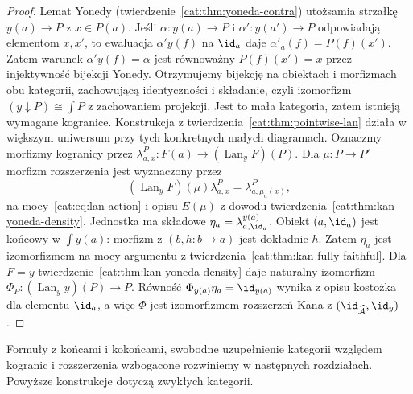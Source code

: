 \begin{proof}
Lemat Yonedy (twierdzenie~\ref{cat:thm:yoneda-contra}) utożsamia strzałkę $y(a)\to P$ z $x\in P(a)$. Jeśli $\alpha:y(a)\to P$ i $\alpha':y(a')\to P$ odpowiadają elementom $x,x'$, to ewaluacja $\alpha' y(f)$ na $\id_a$ daje $\alpha'_a(f)=P(f)(x')$. Zatem warunek $\alpha' y(f)=\alpha$ jest równoważny $P(f)(x')=x$ przez injektywność bijekcji Yonedy. Otrzymujemy bijekcję na obiektach i morfizmach obu kategorii, zachowującą identyczności i składanie, czyli izomorfizm $(y\downarrow P)\cong\int P$ z zachowaniem projekcji. Jest to mała kategoria, zatem istnieją wymagane kogranice. Konstrukcja z twierdzenia~\ref{cat:thm:pointwise-lan} działa w większym uniwersum przy tych konkretnych małych diagramach. Oznaczmy morfizmy kogranicy przez $\lambda^P_{a,x}:F(a)\to(\operatorname{Lan}_y F)(P)$. Dla $\mu:P\to P'$ morfizm rozszerzenia jest wyznaczony przez
\[
 (\operatorname{Lan}_y F)(\mu)\lambda^P_{a,x}
 =\lambda^{P'}_{a,\mu_a(x)},
\]
na mocy~\eqref{cat:eq:lan-action} i opisu $E(\mu)$ z dowodu twierdzenia~\ref{cat:thm:kan-yoneda-density}. Jednostka ma składowe $\eta_a=\lambda^{y(a)}_{a,\id_a}$. Obiekt $(a,\id_a)$ jest końcowy w $\int y(a)$: morfizm z $(b,h:b\to a)$ jest dokładnie $h$. Zatem $\eta_a$ jest izomorfizmem na mocy argumentu z twierdzenia~\ref{cat:thm:kan-fully-faithful}. Dla $F=y$ twierdzenie~\ref{cat:thm:kan-yoneda-density} daje naturalny izomorfizm $\Phi_P:(\operatorname{Lan}_y y)(P)\to P$. Równość $\Phi_{y(a)}\eta_a=\id_{y(a)}$ wynika z opisu kostożka dla elementu $\id_a$, a więc $\Phi$ jest izomorfizmem rozszerzeń Kana z $(\id_{\widehat{\mathcal A}},\id_y)$.
\end{proof}
\begin{uwaga}
Formuły z końcami i kokońcami, swobodne uzupełnienie kategorii względem kogranic i rozszerzenia wzbogacone rozwiniemy w następnych rozdziałach. Powyższe konstrukcje dotyczą zwykłych kategorii.
\end{uwaga}
